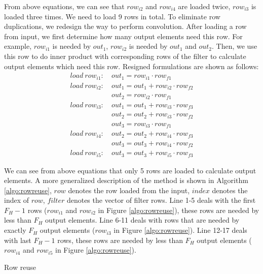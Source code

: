 \documentclass[sigplan,review,anonymous]{acmart}\settopmatter{printfolios=true,printccs=false,printacmref=false}
\begin{document}
From above equations, we can see that $row_{i2}$ and $row_{i4}$ are loaded twice, $row_{i3}$ is loaded three times. We need to load 9 rows in total. To eliminate row duplications, we redesign the way to perform convolution. After loading a row from input, we first determine how many output elements need this row. For example, $row_{i1}$ is needed by $out_1$, $row_{i2}$ is needed by $out_1$ and $out_2$. Then, we use this row to do inner product with corresponding rows of the filter to calculate output elements which need this row. Resigned formulations are shown as follows:
\begin{equation}\nonumber
\begin{aligned}
load\ row_{i1}:
&\ out_1=row_{i1} \cdot row_{f1} \\
load\ row_{i2}:
&\ out_1 = out_1+row_{i2} \cdot row_{f2}\\
&\ out_2=row_{i2} \cdot row_{f1}\\
load\ row_{i3}:
&\ out_1 = out_1+row_{i3} \cdot row_{f3}\\
&\ out_2 = out_2+row_{i3} \cdot row_{f2}\\
&\ out_{3}=row_{i3} \cdot row_{f1}\\
load\ row_{i4}:
&\ out_2=out_2+row_{i4} \cdot row_{f3} \\
&\ out_3=out_3+row_{i4} \cdot row_{f2}\\
load\ row_{i5}:
&\ out_3=out_3+row_{i5} \cdot row_{f3}
\end{aligned}	
\end{equation}



We can see from above equations that only 5 rows are loaded to calculate output elements. A more generalized description of the method is shown in Algorithm \ref{algo:rowreuse}, $row$ denotes the row loaded from the input, $index$ denotes the index of $row$, $filter$ denotes the vector of filter rows. Line 1-5 deals with the first $F_H-1$ rows ($row_{i1}$ and $row_{i2}$ in Figure \ref{algo:rowreuse}), these rows are needed by less than $F_H$ output elements. Line 6-11 deals with rows that are needed by exactly $F_H$ output elements ($row_{i3}$ in Figure \ref{algo:rowreuse}). Line 12-17 deals with last $F_H-1$ rows, these rows are needed by less than $F_H$ output elements ($row_{i4}$ and $row_{i5}$ in Figure \ref{algo:rowreuse}).

\begin{algorithm}
	\caption{Row reuse}
	\label{algo:rowreuse}
\end{algorithm}
\end{document}
